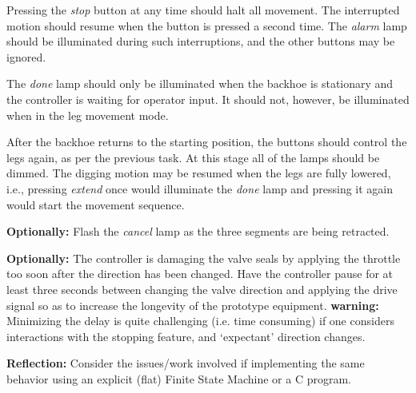 \documentclass[12pt]{article}
\newcounter{task}
\begin{document}
Pressing the \emph{stop} button at any time should halt all movement.
The interrupted motion should resume when the button is pressed a second 
time.
The \emph{alarm} lamp should be illuminated during such interruptions, and 
the other buttons may be ignored.

The \emph{done} lamp should only be illuminated when the backhoe is 
stationary and the controller is waiting for operator input.
It should not, however, be illuminated when in the leg movement mode.

After the backhoe returns to the starting position, the buttons should 
control the legs again, as per the previous task.
At this stage all of the lamps should be dimmed.
The digging motion may be resumed when the legs are fully lowered, i.e., 
pressing \emph{extend} once would illuminate the \emph{done} lamp and 
pressing it again would start the movement sequence.

\textbf{Optionally:} Flash the \emph{cancel} lamp as the three segments are 
being retracted.

\textbf{Optionally:} The controller is damaging the valve seals by applying 
the throttle too soon after the direction has been changed.
Have the controller pause for at least three seconds between changing the 
valve direction and applying the drive signal so as to increase the 
longevity of the prototype equipment.
\textbf{warning:} Minimizing the delay is quite challenging (i.e. time 
consuming) if one considers interactions with the stopping feature, and 
`expectant' direction changes.

\textbf{Reflection:} Consider the issues/work involved if implementing the 
same behavior using an explicit (flat) Finite State Machine or a C program.




\end{document}

